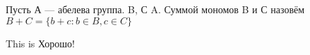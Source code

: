 



Пусть А --- абелева группа. B, С A. Суммой мономов 
B и С назовём $B + C = \{ b + c : b \in B , c \in C\}$

\LARGE
This is Хорошо!



